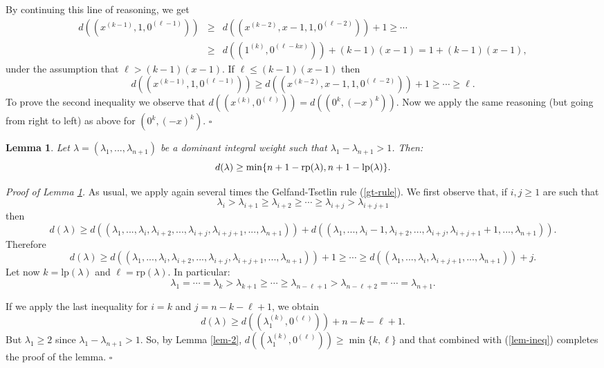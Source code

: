 \documentclass[12pt]{amsart}
\newtheorem{lem}[thm]{Lemma}
\begin{document}
 
By continuing this line of reasoning, we get
\begin{eqnarray*}
d((x^{(k-1)},1, 0^{(\ell-1)})) & \geq & d((x^{(k-2)},x-1,1, 0^{(\ell-2)})) + 1 \geq \cdots \\
& \geq & d((1^{(k)}, 0^{(\ell-kx)})) + (k-1)(x-1) = 1 + (k-1)(x-1),
\end{eqnarray*}
under the assumption that $\ell>(k-1)(x-1)$. If $\ell \leq (k-1)(x-1)$ then 
$$
d((x^{(k-1)},1, 0^{(\ell-1)})) \geq d((x^{(k-2)},x-1,1, 0^{(\ell-2)})) + 1 \geq \cdots \geq \ell.
$$ 
To prove the second inequality we observe that $d((x^{(k)}, 0^{(\ell)})) = d((0^k, (-x)^k))$. Now we apply the same reasoning (but going from right to left) as above  for $(0^k, (-x)^k)$. \hfill $\square$

\begin{lem} \label{lem-3}
 Let $\lambda = (\lambda_1,...,\lambda_{n+1})$ be a dominant integral weight   such that $\lambda_1 - \lambda_{n+1} >1$. Then:
$$
d(\lambda) \geq \min\{ {n+1} - {\rm rp}(\lambda), {n+1} - {\rm lp}(\lambda)\}.
$$ 
\end{lem}
\noindent\emph{Proof of Lemma \ref{lem-3}.}  As usual, we apply again several times the Gelfand-Tsetlin rule (\ref{gt-rule}). We first observe that, if $i, j \geq 1$ are such that 
$$\lambda_i > \lambda_{i+1} \geq \lambda_{i+2} \geq \cdots \geq \lambda_{i+j} > \lambda_{i+j+1}
$$
then 
$$
d(\lambda) \geq d((\lambda_1,...,\lambda_i, \lambda_{i+2},...,\lambda_{i+j}, \lambda_{i+j+1}, ..., \lambda_{n+1})) + d((\lambda_1,...,\lambda_i -1, \lambda_{i+2},...,\lambda_{i+j}, \lambda_{i+j+1} + 1, ..., \lambda_{n+1})).
$$
Therefore
$$
d(\lambda) \geq d((\lambda_1,...,\lambda_i, \lambda_{i+2},...,\lambda_{i+j}, \lambda_{i+j+1}, ..., \lambda_{n+1})) + 1 \geq \cdots \geq d((\lambda_1,...,\lambda_i, \lambda_{i+j+1}, ..., \lambda_{n+1})) + j. 
$$
Let now $k =  \mbox{lp}(\lambda)$ and $\ell =  \mbox{rp}(\lambda)$. In particular: 
$$\lambda_1 = \cdots  = \lambda_k > \lambda_{k+1} \geq \cdots \geq \lambda_{n-\ell+1} > \lambda_{n-\ell + 2} = \cdots = \lambda_{n+1}.$$


If we apply the last inequality for $i = k$ and $j = n-k-\ell+1$, we obtain  
\begin{equation} \label{lem-ineq}
d(\lambda) \geq d((\lambda_1^{(k)}, 0^{(\ell)})) + n-k-\ell+1.
\end{equation}
But $\lambda_1 \geq 2$ since $\lambda_1 - \lambda_{n+1} >1$. So, by Lemma \ref{lem-2}, $d((\lambda_1^{(k)}, 0^{(\ell)})) \geq \min \{ k, \ell\}$ and that combined with (\ref{lem-ineq}) completes the proof of the lemma. \hfill $\square$
\end{document}
